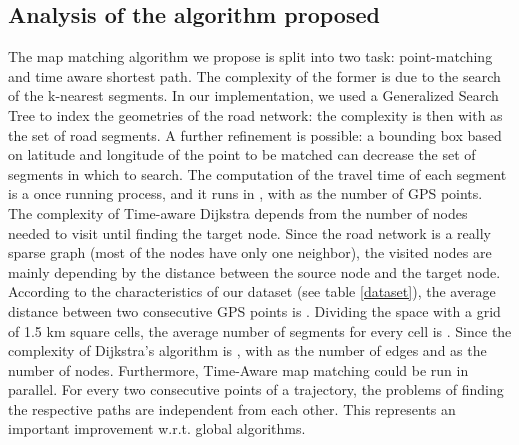 \documentclass[5p]{elsarticle}
\begin{document}
\subsection{Analysis of the algorithm proposed}

The map matching algorithm we propose is split into two task: point-matching and time aware shortest path. The complexity of the former is due to the search of the k-nearest segments. 
In our implementation, we used a Generalized Search Tree to index the geometries of the road network: the complexity is then  with  as the set of road segments.
A further refinement is possible: a bounding box based on latitude and longitude of the point to be matched can decrease the set of segments in which to search. The computation of the travel time of each segment is a once running process, and it runs in , with  as the number of GPS points.\\
The complexity of Time-aware Dijkstra depends from the number of nodes needed to visit until finding the target node. Since the road network is a really sparse graph (most of the nodes have only one neighbor), 
the visited nodes are mainly depending by the distance between the source node and the target node.  According to the characteristics of our dataset (see table \ref{dataset}), the average distance between two 
consecutive GPS points is . Dividing the space with a grid of 1.5 km square cells, the average number of segments for every cell is  . Since the complexity of Dijkstra's algorithm
is , with   as the number of edges and  as the number of nodes.
Furthermore, Time-Aware map matching could be run in parallel. For every two consecutive points of a trajectory, the problems of finding the respective paths are independent from each other. This represents an 
important improvement w.r.t. global algorithms. 
\end{document}
